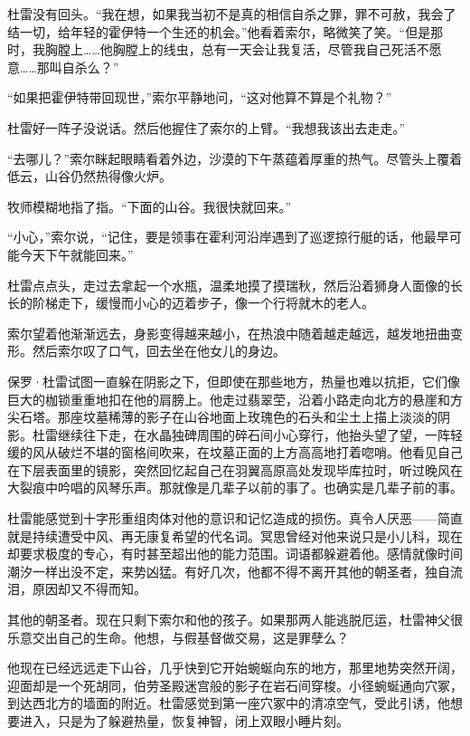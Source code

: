 \documentclass[AutoFakeBold=true]{book}
\begin{document}
杜雷没有回头。``我在想，如果我当初不是真的相信自杀之罪，罪不可赦，我会了结一切，给年轻的霍伊特一个生还的机会。''他看着索尔，略微笑了笑。``但是那时，我胸膛上……他胸膛上的线虫，总有一天会让我复活，尽管我自己死活不愿意……那叫自杀么？''

``如果把霍伊特带回现世，''索尔平静地问，``这对他算不算是个礼物？''

杜雷好一阵子没说话。然后他握住了索尔的上臂。``我想我该出去走走。''

``去哪儿？''索尔眯起眼睛看着外边，沙漠的下午蒸蕴着厚重的热气。尽管头上覆着低云，山谷仍然热得像火炉。

牧师模糊地指了指。``下面的山谷。我很快就回来。''

``小心，''索尔说，``记住，要是领事在霍利河沿岸遇到了巡逻掠行艇的话，他最早可能今天下午就能回来。''

杜雷点点头，走过去拿起一个水瓶，温柔地摸了摸瑞秋，然后沿着狮身人面像的长长的阶梯走下，缓慢而小心的迈着步子，像一个行将就木的老人。

索尔望着他渐渐远去，身影变得越来越小，在热浪中随着越走越远，越发地扭曲变形。然后索尔叹了口气，回去坐在他女儿的身边。

\vspace*{1em}

保罗·杜雷试图一直躲在阴影之下，但即使在那些地方，热量也难以抗拒，它们像巨大的枷锁重重地扣在他的肩膀上。他走过翡翠茔，沿着小路走向北方的悬崖和方尖石塔。那座坟墓稀薄的影子在山谷地面上玫瑰色的石头和尘土上描上淡淡的阴影。杜雷继续往下走，在水晶独碑周围的碎石间小心穿行，他抬头望了望，一阵轻缓的风从破烂不堪的窗格间吹来，在坟墓正面的上方高高地打着唿哨。他看见自己在下层表面里的镜影，突然回忆起自己在羽翼高原高处发现毕库拉时，听过晚风在大裂痕中吟唱的风琴乐声。那就像是几辈子以前的事了。也{\kaishu 确实}是几辈子前的事。

杜雷能感觉到十字形重组肉体对他的意识和记忆造成的损伤。真令人厌恶——简直就是持续遭受中风、再无康复希望的代名词。冥思曾经对他来说只是小儿科，现在却要求极度的专心，有时甚至超出他的能力范围。词语都躲避着他。感情就像时间潮汐一样出没不定，来势凶猛。有好几次，他都不得不离开其他的朝圣者，独自流泪，原因却又不得而知。

其他的朝圣者。现在只剩下索尔和他的孩子。如果那两人能逃脱厄运，杜雷神父很乐意交出自己的生命。他想，与假基督做交易，这是罪孽么？

他现在已经远远走下山谷，几乎快到它开始蜿蜒向东的地方，那里地势突然开阔，迎面却是一个死胡同，伯劳圣殿迷宫般的影子在岩石间穿梭。小径蜿蜒通向穴冢，到达西北方的墙面的附近。杜雷感觉到第一座穴冢中的清凉空气，受此引诱，他想要进入，只是为了躲避热量，恢复神智，闭上双眼小睡片刻。
\end{document}
